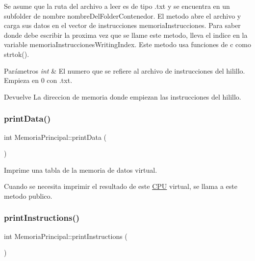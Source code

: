 Se asume que la ruta del archivo a leer es de tipo {\ttfamily .txt} y se encuentra en un subfolder de nombre nombre\+Del\+Folder\+Contenedor. El metodo abre el archivo y carga sus datos en el vector de instrucciones memoria\+Instrucciones. Para saber donde debe escribir la proxima vez que se llame este metodo, lleva el indice en la variable memoria\+Instrucciones\+Writing\+Index. Este metodo usa funciones de c como strtok(). 
\begin{DoxyParams}{Parámetros}
{\em int} & El numero que se refiere al archivo de instrucciones del hilillo. Empieza en 0 con {.\+txt}. \\
\hline
\end{DoxyParams}
\begin{DoxyReturn}{Devuelve}
La direccion de memoria donde empiezan las instrucciones del hilillo. 
\end{DoxyReturn}
\mbox{\label{classMemoriaPrincipal_a0f07dc1a0723d5403a176f311a27ed1a}} 
\subsubsection{\texorpdfstring{print\+Data()}{printData()}}
{\footnotesize\ttfamily int Memoria\+Principal\+::print\+Data (\begin{DoxyParamCaption}{ }\end{DoxyParamCaption})}



Imprime una tabla de la memoria de datos virtual. 

Cuando se necesita imprimir el resultado de este \hyperlink{classCPU}{C\+PU} virtual, se llama a este metodo publico. \mbox{\label{classMemoriaPrincipal_ae7d66a00cbcbd3a51d99d1ec89bb26b5}} 
\subsubsection{\texorpdfstring{print\+Instructions()}{printInstructions()}}
{\footnotesize\ttfamily int Memoria\+Principal\+::print\+Instructions (\begin{DoxyParamCaption}{ }\end{DoxyParamCaption})}



